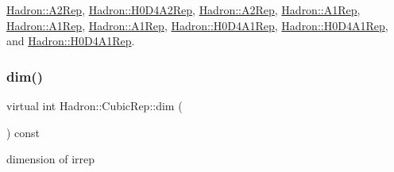 \mbox{\hyperlink{structHadron_1_1A2Rep_a17b15564f35f6be6afa4a189806da16b}{Hadron\+::\+A2\+Rep}}, \mbox{\hyperlink{structHadron_1_1H0D4A2Rep_ab746308c018d06bc8d3e1822f84c9049}{Hadron\+::\+H0\+D4\+A2\+Rep}}, \mbox{\hyperlink{structHadron_1_1A2Rep_a17b15564f35f6be6afa4a189806da16b}{Hadron\+::\+A2\+Rep}}, \mbox{\hyperlink{structHadron_1_1A1Rep_a4f7f61f8c9a5113c9407be6609cf7fbe}{Hadron\+::\+A1\+Rep}}, \mbox{\hyperlink{structHadron_1_1A1Rep_a4f7f61f8c9a5113c9407be6609cf7fbe}{Hadron\+::\+A1\+Rep}}, \mbox{\hyperlink{structHadron_1_1A1Rep_a4f7f61f8c9a5113c9407be6609cf7fbe}{Hadron\+::\+A1\+Rep}}, \mbox{\hyperlink{structHadron_1_1H0D4A1Rep_ac5a45aa7f7cdc3ab70b8c164b2e1dce0}{Hadron\+::\+H0\+D4\+A1\+Rep}}, \mbox{\hyperlink{structHadron_1_1H0D4A1Rep_ac5a45aa7f7cdc3ab70b8c164b2e1dce0}{Hadron\+::\+H0\+D4\+A1\+Rep}}, and \mbox{\hyperlink{structHadron_1_1H0D4A1Rep_ac5a45aa7f7cdc3ab70b8c164b2e1dce0}{Hadron\+::\+H0\+D4\+A1\+Rep}}.

\mbox{\label{structHadron_1_1CubicRep_ac178d14064f037a66af4b9fb4b312d51}} 
\subsubsection{\texorpdfstring{dim()}{dim()}\hspace{0.1cm}{\footnotesize\ttfamily [3/3]}}
{\footnotesize\ttfamily virtual int Hadron\+::\+Cubic\+Rep\+::dim (\begin{DoxyParamCaption}{ }\end{DoxyParamCaption}) const\hspace{0.3cm}{\ttfamily [pure virtual]}}

dimension of irrep 


